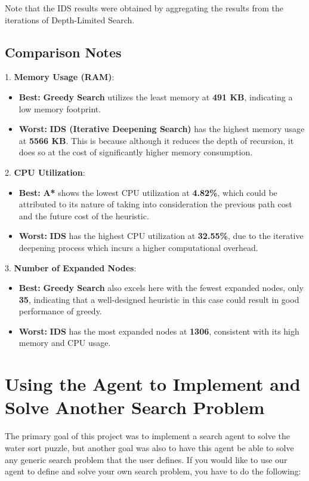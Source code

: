 \documentclass{article}
\begin{document}
Note that the IDS results were obtained by aggregating the results from the iterations of Depth-Limited Search.

\subsection{Comparison Notes}

1. \textbf{Memory Usage (RAM)}:
\begin{itemize}
    \item \textbf{Best:} \textbf{Greedy Search} utilizes the least memory at \textbf{491 KB}, indicating a low memory footprint.
    \item \textbf{Worst:} \textbf{IDS (Iterative Deepening Search)} has the highest memory usage at \textbf{5566 KB}. This is because although it reduces the depth of recursion, it does so at the cost of significantly higher memory consumption.
\end{itemize}
2. \textbf{CPU Utilization}:
\begin{itemize}
    \item \textbf{Best:} \textbf{A*} shows the lowest CPU utilization at \textbf{4.82\%}, which could be attributed to its nature of taking into consideration the previous path cost and the future cost of the heuristic.
    \item \textbf{Worst:} \textbf{IDS} has the highest CPU utilization at \textbf{32.55\%}, due to the iterative deepening process which incurs a higher computational overhead.
\end{itemize}
3. \textbf{Number of Expanded Nodes}:
\begin{itemize}
    \item \textbf{Best:} \textbf{Greedy Search} also excels here with the fewest expanded nodes, only \textbf{35}, indicating that a well-designed heuristic in this case could result in good performance of greedy.
    \item \textbf{Worst:} \textbf{IDS} has the most expanded nodes at \textbf{1306}, consistent with its high memory and CPU usage.
\end{itemize}

\newpage

\section{Using the Agent to Implement and Solve Another Search Problem}

The primary goal of this project was to implement a search agent to solve the water sort puzzle, but another goal was also to have this agent be able to solve any generic search problem that the user defines. If you would like to use our agent to define and solve your own search problem, you have to do the following: 
\end{document}
